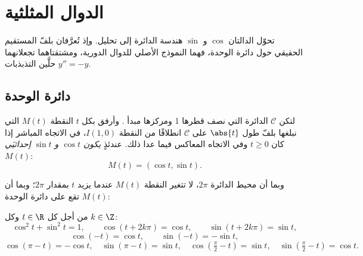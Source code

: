 \chapter{الدوال المثلثية}\label{ch:g12:trigo}

تحوّل الدالتان $\cos$ و $\sin$ هندسة الدائرة إلى
تحليل. وإذ تُعرَّفان بلفّ المستقيم الحقيقي حول دائرة الوحدة، فهما
النموذج الأصلي للدوال الدورية، ومشتقتاهما تجعلانهما
حلَّين  التذبذبات $y'' = -y$.

\section{دائرة الوحدة}

\begin{definition}\label{def:g12:trigo:cossin}
لتكن $\mathcal{C}$ الدائرة التي نصف قطرها 1 ومركزها مبدأ
. وأرفق بكل  $t$ النقطة $M(t)$
التي نبلغها بلفّ طول $\abs{t}$ على $\mathcal{C}$ انطلاقًا من النقطة
$I(1,0)$، في الاتجاه المباشر إذا كان $t \geq 0$ وفي الاتجاه المعاكس فيما عدا ذلك. عندئذٍ
\emph{يكون $\cos t$ و $\sin t$ إحداثيَي
$M(t)$}:
\[
M(t) = (\cos t, \sin t).
\]
\end{definition}

\begin{omfigure}
\end{omfigure}

وبما أن محيط الدائرة $2\pi$، لا تتغير النقطة $M(t)$ عندما
يزيد $t$ بمقدار $2\pi$؛ وبما أن $M(t)$ تقع على دائرة الوحدة:

\begin{proposition}\label{prop:g12:trigo:identities}
من أجل كل $t \in \R$ وكل $k \in \Z$:
\[
\cos^2 t + \sin^2 t = 1, \qquad
\cos(t + 2k\pi) = \cos t, \qquad
\sin(t + 2k\pi) = \sin t,
\]
\[
\cos(-t) = \cos t, \qquad \sin(-t) = -\sin t,
\]
\[
\cos(\pi - t) = -\cos t, \quad \sin(\pi - t) = \sin t, \quad
\cos\left(\tfrac{\pi}{2} - t\right) = \sin t, \quad
\sin\left(\tfrac{\pi}{2} - t\right) = \cos t .
\]
\end{proposition}

